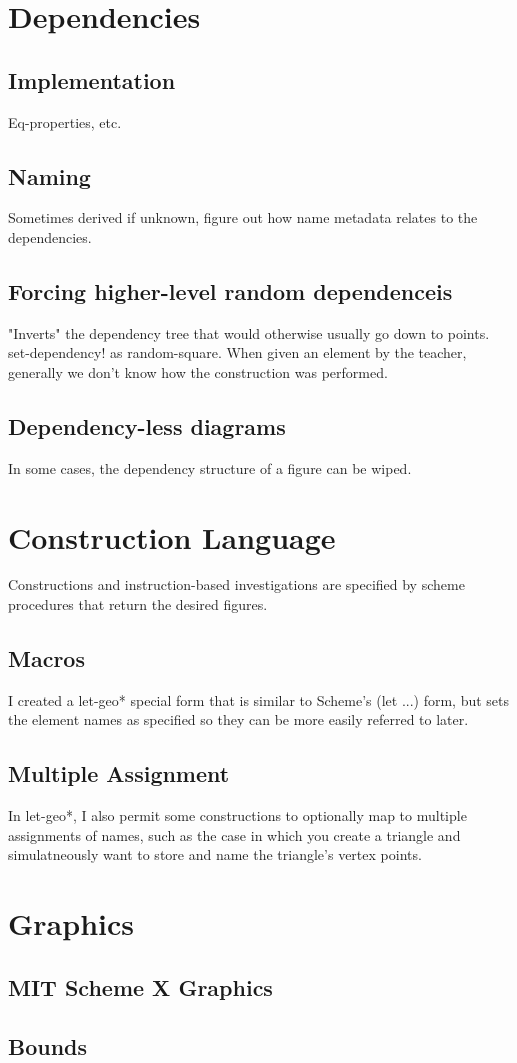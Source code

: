 \section{Dependencies}

\subsection{Implementation}

Eq-properties, etc.

\subsection{Naming}

Sometimes derived if unknown, figure out how name metadata relates to
the dependencies.

\subsection{Forcing higher-level random dependenceis}

"Inverts" the dependency tree that would otherwise usually go
down to points. set-dependency! as random-square. When given an
element by the teacher, generally we don't know how the construction
was performed.

\subsection{Dependency-less diagrams}

In some cases, the dependency structure of a figure can be wiped.

\section{Construction Language}

Constructions and instruction-based investigations are specified by
scheme procedures that return the desired figures.

\subsection{Macros}

I created a let-geo* special form that is similar to Scheme's (let
...) form, but sets the element names as specified so they can be more
easily referred to later.

\subsection{Multiple Assignment}

In let-geo*, I also permit some constructions to optionally map to
multiple assignments of names, such as the case in which you create a
triangle and simulatneously want to store and name the triangle's
vertex points.

\section{Graphics}

\subsection{MIT Scheme X Graphics}

\subsection{Bounds}
